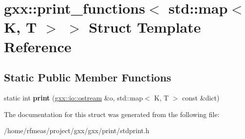 \hypertarget{structgxx_1_1print__functions_3_01std_1_1map_3_01K_00_01T_01_4_01_4}{}\section{gxx\+:\+:print\+\_\+functions$<$ std\+:\+:map$<$ K, T $>$ $>$ Struct Template Reference}
\label{structgxx_1_1print__functions_3_01std_1_1map_3_01K_00_01T_01_4_01_4}
\subsection*{Static Public Member Functions}
\begin{DoxyCompactItemize}
\item 
static int {\bfseries print} (\hyperlink{classgxx_1_1io_1_1ostream}{gxx\+::io\+::ostream} \&o, std\+::map$<$ K, T $>$ const \&dict)\hypertarget{structgxx_1_1print__functions_3_01std_1_1map_3_01K_00_01T_01_4_01_4_aa961bdd16710829a07bf1724c4aaa663}{}\label{structgxx_1_1print__functions_3_01std_1_1map_3_01K_00_01T_01_4_01_4_aa961bdd16710829a07bf1724c4aaa663}

\end{DoxyCompactItemize}


The documentation for this struct was generated from the following file\+:\begin{DoxyCompactItemize}
\item 
/home/rfmeas/project/gxx/gxx/print/stdprint.\+h\end{DoxyCompactItemize}
